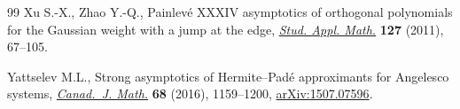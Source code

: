\documentclass[10pt,a4paper]{amsart}
\numberwithin{equation}{section}
\begin{document}
\begin{thebibliography}{99}
Xu S.-X., Zhao Y.-Q., Painlev\'e {XXXIV} asymptotics of orthogonal polynomials
 for the {G}aussian weight with a jump at the edge,
 \href{https://doi.org/10.1111/j.1467-9590.2010.00512.x}{\textit{Stud. Appl.
 Math.}} \textbf{127} (2011), 67--105.

Yattselev M.L., Strong asymptotics of {H}ermite--{P}ad\'e approximants for
 {A}ngelesco systems,
 \href{https://doi.org/10.4153/CJM-2015-043-3}{\textit{Canad.~J. Math.}}
 \textbf{68} (2016), 1159--1200, \href{http://arxiv.org/abs/1507.07596}{arXiv:1507.07596}.

\end{thebibliography}
\end{document}
